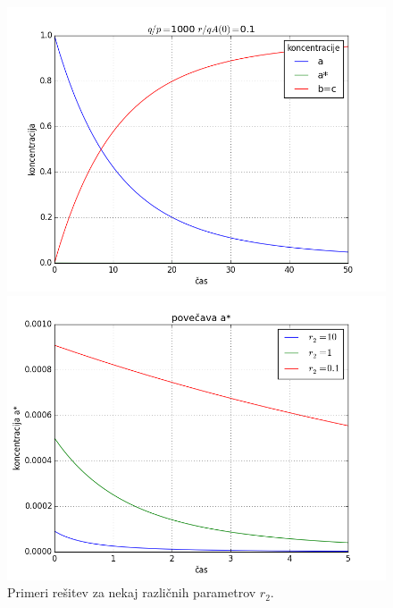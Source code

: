 \documentclass[slovene,11pt,a4paper]{article}
\numberwithin{equation}{section} %
\numberwithin{figure}{section} %
\numberwithin{table}{section} %
\begin{document}
\begin{figure}[h]
{\begin{minipage}[t]{0.5\paperwidth}
\begin{flushleft}

\includegraphics[scale=0.4]{slike/q_p_1000_r_qA(0)_0_1.png}
\hspace{\fill}
\end{flushleft}
\end{minipage}
\begin{minipage}[t]{0.5\paperwidth}
\includegraphics[scale=0.4]{slike/povecaca_binarana.png}
\end{minipage}%
}
\caption{Primeri rešitev za nekaj različnih parametrov $r_2$.}
\end{figure}
\pagebreak
\end{document}
